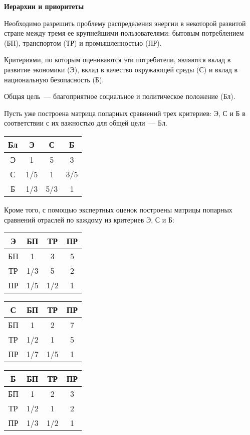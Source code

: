 \documentclass[a4paper,14pt]{extarticle}
\begin{document}
{
\bfseries Иерархии и приоритеты
\par\vspace{1mm}
}
    Необходимо разрешить проблему распределения энергии в некоторой развитой стране между тремя ее крупнейшими пользователями: бытовым потреблением (БП), транспортом (ТР) и промышленностью (ПР). 
        
    Критериями, по которым оцениваются эти потребители, являются вклад в развитие экономики (Э), вклад в качество окружающей среды (С) и вклад в национальную безопасность (Б). 

    Общая цель~--- благоприятное социальное и политическое положение (Бл). 
    
    Пусть уже построена матрица попарных сравнений трех критериев: Э, С и Б в соответствии с их важностью для общей цели~--- Бл. 
    
    {\centering
    \begin{tabular}{c|ccc}
        Бл & Э   & С   &  Б   \\
        \hline
        Э  & 1   & 5   &  3   \\ 
        С  & 1/5 & 1   &  3/5 \\ 
        Б  & 1/3 & 5/3 &  1   \\
    \end{tabular}
    \par}

    Кроме того, с помощью экспертных оценок построены матрицы попарных сравнений отраслей по каждому из критериев Э, С и Б:

    {\centering
    \begin{tabular}{c|ccc}
        \textbf{Э}  & БП  & ТР  & ПР \\ 
        \hline
        БП & 1   & 3   & 5  \\
        ТР & 1/3 & 5   & 2  \\
        ПР & 1/5 & 1/2 & 1  \\
    \end{tabular}\quad
    \begin{tabular}{c|ccc}
        \textbf{С}  & БП  & ТР  & ПР\\ 
        \hline
        БП & 1   & 2   & 7 \\
        ТР & 1/2 & 1   & 5 \\
        ПР & 1/7 & 1/5 & 1 \\
    \end{tabular}\quad
    \begin{tabular}{c|ccc}
        \textbf{Б}  & БП  & ТР  & ПР\\ 
        \hline
        БП & 1   & 2   & 3 \\
        ТР & 1/2 & 1   & 2 \\
        ПР & 1/3 & 1/2 & 1 \\
    \end{tabular}
    \par}
\end{document}
